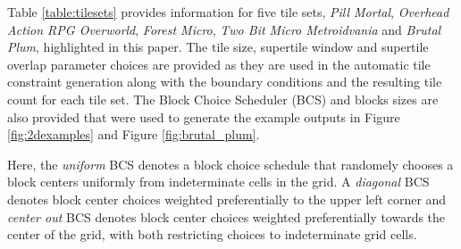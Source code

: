 

Table \ref{table:tilesets} provides information for five tile sets, \textit{Pill Mortal}, \textit{Overhead Action RPG Overworld},
\textit{Forest Micro}, \textit{Two Bit Micro Metroidvania} and \textit{Brutal Plum}, highlighted in this paper.
The tile size, supertile window and supertile overlap parameter choices are provided as they are used in the automatic tile constraint generation
along with the boundary conditions and the resulting tile count for each tile set.
The Block Choice Scheduler (BCS) and blocks sizes are also provided that were used to generate the example outputs in Figure \ref{fig:2dexamples} and Figure \ref{fig:brutal_plum}.

Here, the \textit{uniform} BCS denotes a block choice schedule that randomely chooses a block centers uniformly from
indeterminate cells in the grid.
A \textit{diagonal} BCS denotes block center choices weighted preferentially to the upper left corner and
\textit{center out} BCS denotes block center choices weighted preferentially towards the center of the grid,
with both restricting choices to indeterminate grid cells.


